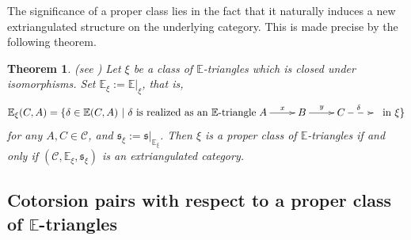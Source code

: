 \documentclass[11pt,a4paper]{amsart}
\numberwithin{equation}{section}
\theoremstyle{plain}
\newtheorem{thm}{Theorem}[section]
\begin{document}
	
	
The significance of a proper class lies in the fact that it naturally induces a new extriangulated structure on the underlying category. This is made precise by the following theorem.	
	
		\begin{thm} \emph{(see \cite[Theorem 3.2]{hu2020proper})} Let $\xi$ be a class of $\mathbb{E}$-triangles which is closed under isomorphisms.
			Set $\mathbb{E}_\xi:=\mathbb{E}|_\xi$, that is, $$\mathbb{E}_\xi(C, A)=\{\delta\in\mathbb{E}(C, A)~|~\delta~ \textrm{is realized as an $\mathbb{E}$-triangle}\xymatrix{A\ar[r]^x&B\ar[r]^y&C\ar@{-->}[r]^{\delta}&}~\textrm{in}~\xi\}$$ for any $A, C\in\mathcal{C}$, and $\mathfrak{s}_\xi:=\mathfrak{s}|_{\mathbb{E}_\xi}$. Then $\xi$ is a  proper class  of $\mathbb{E}$-triangles if and only if $(\mathcal{C}, \mathbb{E}_\xi, \mathfrak{s}_\xi)$ is an extriangulated category.
		\end{thm}
		
		
		
		
		
		
	\subsection{\texorpdfstring{Cotorsion pairs with respect to a proper class of $\mathbb{E}$-triangles}{Cotorsion pairs with respect to a proper class of E-triangles}}
	
\end{document}
